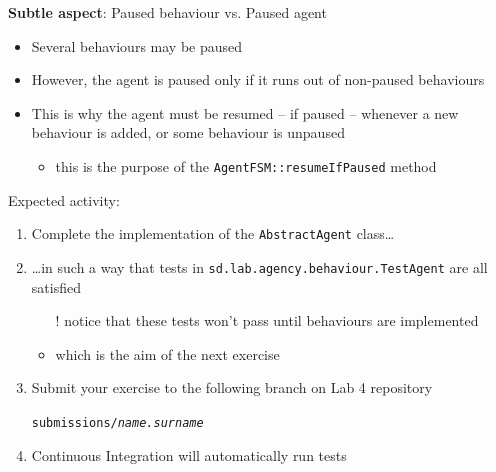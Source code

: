 \documentclass[presentation]{beamer}\mode<presentation>{\usetheme{AMSCesenaPurpleAndGold}}
\newcommand{\labN}{4}
\begin{document}
\begin{frame}[c, allowframebreaks]
    \begin{alertblock}{\textbf{Subtle aspect}: Paused behaviour vs. Paused agent}
        \begin{itemize}
            \item Several behaviours may be paused

            \medskip

            \item However, the agent is \alert{paused} only if it runs out of non-paused behaviours

            \medskip

            \item This is why the agent must be resumed -- if paused -- whenever a new behaviour is added, or some behaviour is unpaused
            \begin{itemize}
                \item this is the purpose of the \texttt{AgentFSM::\alert{resumeIfPaused}} method
            \end{itemize}
        \end{itemize}
    \end{alertblock}

    \framebreak

    Expected activity:
    \bigskip
    \begin{enumerate}

        \item Complete the implementation of the \texttt{AbstractAgent} class\ldots

        \bigskip

        \item \ldots in such a way that tests in \texttt{sd.lab.agency.behaviour.\alert{TestAgent}} are all satisfied
        \begin{itemize}
            \item[!] notice that these tests won't pass until behaviours are implemented
            \item which is the aim of the next exercise
        \end{itemize}

        \bigskip

        \item Submit your exercise to the following branch on Lab \labN{} repository
        \begin{center}
            \texttt{submissions/\textit{name.surname}}
        \end{center}

        \bigskip

        \item Continuous Integration will automatically run tests
    \end{enumerate}

\end{frame}
\end{document}
